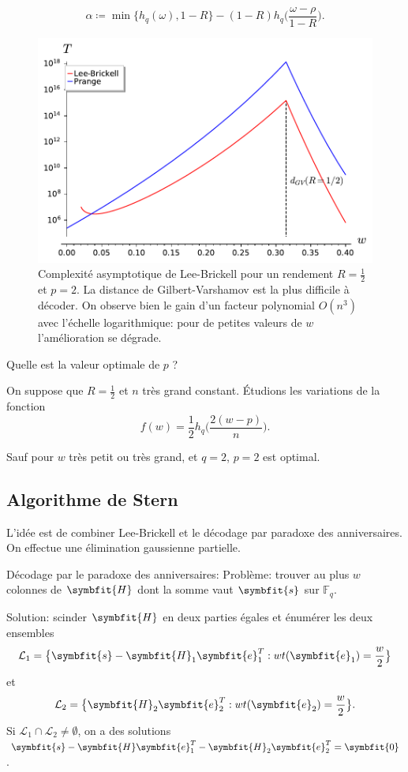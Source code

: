 \documentclass{scrartcl}[a4paper,9pt,headings=small,footinclude=false]
\theoremstyle{definition}
\theoremstyle{remark}
\begin{document}
\[
\alpha \coloneq \min\{ h_q(\omega), 1-R \} - (1-R) h_q\bigg(\frac{\omega - \rho}{1-R}\bigg).
\]

\begin{figure}[h]
\centering
\includegraphics{decodage_syndrome/LB.pdf}
\caption{Complexité asymptotique de Lee-Brickell pour un rendement $R=\frac{1}{2}$ et $p=2$. La distance de Gilbert-Varshamov est la plus difficile à décoder. On observe bien le gain d'un facteur polynomial $O(n^3)$ avec l'échelle logarithmique: pour de petites valeurs de $w$ l'amélioration se dégrade.}
\label{fig:prange}
\end{figure}

Quelle est la valeur optimale de $p$ ?

On suppose que $R=\frac{1}{2}$ et $n$ très grand constant.
Étudions les variations de la fonction
\[
f(w)= \frac{1}{2} h_q\bigg(\frac{2(w - p)}{n}\bigg).
\]


Sauf pour $w$ très petit ou très grand, et $q=2$, $p=2$ est optimal.



\subsection{Algorithme de Stern}

L'idée est de combiner Lee-Brickell et le décodage par paradoxe des anniversaires. On effectue une élimination gaussienne partielle.

Décodage par le paradoxe des anniversaires:
Problème: trouver au plus $w$ colonnes de $\symbfit{H}$ dont la somme vaut $\symbfit{s}$ sur $\mathbb{F}_q$.

Solution: scinder $\symbfit{H}$ en deux parties égales et énumérer les deux ensembles
\[\mathcal{L}_1=\big\{ \symbfit{s}-\symbfit{H}_1\symbfit{e}_1^T : wt(\symbfit{e}_1) =\frac{w}{2} \big\}\]
et \[\mathcal{L}_2=\big\{ \symbfit{H}_2 \symbfit{e}_2^T : wt(\symbfit{e}_2) = \frac{w}{2}\big\}.\]
Si $\mathcal{L}_1\cap \mathcal{L}_2\neq \emptyset$, on a des solutions $\symbfit{s}-\symbfit{H}\symbfit{e}_1^T-\symbfit{H}_2\symbfit{e}_2^T=\symbfit{0}$.
\end{document}

